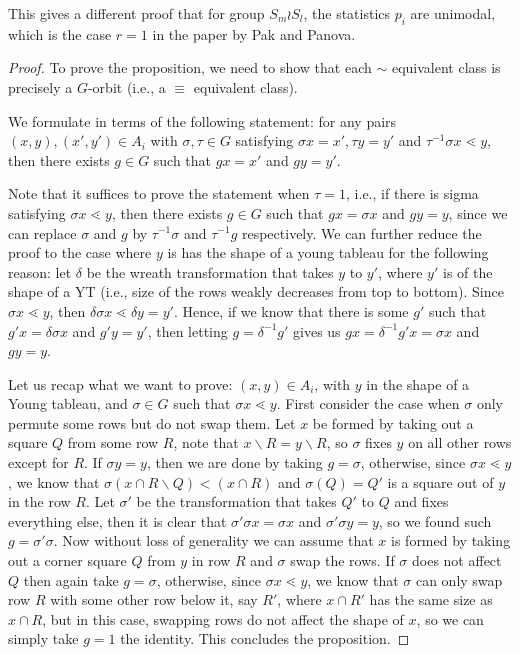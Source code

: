 \documentclass[12pt]{article}
\newcommand{\1}{\mathbb{I}}
\newcommand{\minus}{\backslash}
\theoremstyle{definition}
\theoremstyle{definition}
\theoremstyle{definition}
\theoremstyle{definition}
\theoremstyle{definition}
\theoremstyle{definition}
\begin{document}
\remark This gives a different proof that for group $S_m \wr S_l$, the statistics $p_i$ are unimodal, which is the case $r= 1$ in the paper by Pak and Panova. 

\begin{proof}

To prove the proposition, we need to show that each $\sim$ equivalent class is precisely a $G$-orbit (i.e., a $\equiv$ equivalent class). 

We formulate in terms of the following statement: for any pairs $(x, y), (x', y') \in A_i$ with $\sigma, \tau \in G$ satisfying $\sigma x = x', \tau y = y'$ and $\tau^{-1} \sigma x \lessdot y$, then there exists $g \in G$ such that $gx = x' $ and $gy = y'$. 

Note that it suffices to prove the statement when $\tau = 1$, i.e., if there is sigma satisfying $\sigma x \lessdot y$, then there exists $g \in G$ such that $gx = \sigma x$ and $g y = y$, since we can replace $\sigma $ and $g$ by $\tau^{-1} \sigma $ and $\tau ^{-1} g$ respectively.  We can further reduce the proof to the case where $y$ is has the shape of a young tableau for the following reason: let $\delta$ be the wreath transformation that takes $y$ to $y'$, where $y'$ is of the shape of a YT (i.e., size of the rows weakly decreases from top to bottom). Since $\sigma x \lessdot  y$, then $\delta \sigma x \lessdot \delta y = y'$. Hence, if we know that there is some $g'$ such that $g' x = \delta \sigma x $ and $g' y = y'$, then letting $g= \delta^{-1} g'$ gives us $g x = \delta^{-1} g'x = \sigma x$ and $g y = y$. 

Let us recap what we want to prove: $(x, y) \in A_i$, with $y$ in the shape of a Young tableau, and $\sigma \in G$ such that $\sigma x \lessdot y$. First consider the case when $\sigma$ only permute some rows but do not swap them. Let $x$ be formed by taking out a square $Q$ from some row $R$, note that $x \minus R = y \minus R$, so $\sigma$ fixes $y$ on all other rows except for $R$. If $\sigma y = y$, then we are done by taking $g = \sigma$, otherwise, since $\sigma x \lessdot y$, we know that $\sigma (x \cap R \minus Q) < (x \cap R) $ and $\sigma (Q) = Q'$ is a square out of $y$ in the row $R$. Let $\sigma'$ be the transformation that takes $Q'$ to $Q$ and fixes everything else, then it is clear that $\sigma' \sigma x = \sigma x$ and $\sigma' \sigma y = y$, so we found such $g = \sigma' \sigma$. Now without loss of generality we can assume that $x$ is formed by taking out a corner square $Q$ from $y$ in row $R$ and $\sigma$ swap the rows. If $\sigma$ does not affect $Q$ then again take $g = \sigma$, otherwise, since $\sigma x \lessdot y$, we know that $\sigma$ can only swap row $R$ with some other row below it, say $R'$, where $x \cap R'$ has the same size as $x \cap R$, but in this case, swapping rows do not affect the shape of $x$, so we can simply take $g = 1$ the identity. This concludes the proposition.
\end{proof}
\end{document}
